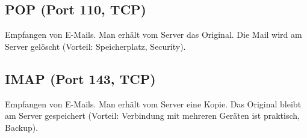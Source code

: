 \subsection*{POP (Port 110, TCP)}
Empfangen von E-Mails. Man erhält vom Server das Original. Die Mail wird am Server gelöscht (Vorteil: Speicherplatz, Security).

\subsection*{IMAP (Port 143, TCP)}
Empfangen von E-Mails. Man erhält vom Server eine Kopie. Das Original bleibt am Server gespeichert (Vorteil: Verbindung mit mehreren Geräten ist praktisch, Backup).
